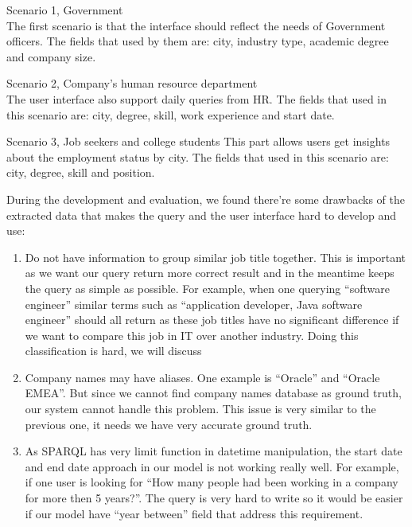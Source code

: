\begin{description}
	\item Scenario 1, Government \hfill \\
	The first scenario is that the interface should reflect the needs of Government officers. The fields that used by them are: city, industry type, academic degree and company size.
	\item Scenario 2, Company's human resource department \hfill \\
	The user interface also support daily queries from HR. The fields that used in this scenario are: city, degree, skill, work experience and start date.
	\item Scenario 3, Job seekers and college students
	This part allows users get insights about the employment status by city. The fields that used in this scenario are: city, degree, skill and position.
\end{description}

During the development and evaluation, we found there're some drawbacks of the extracted data that makes the query and the user interface hard to develop and use:
\begin{enumerate}
	\item Do not have information to group similar job title together. This is important as we want our query return more correct result and in the meantime keeps the query as simple as possible. For example, when one querying ``software engineer'' similar terms such as ``application developer, Java software engineer'' should all return as these job titles have no significant difference if we want to compare this job in IT over another industry. Doing this classification is hard, we will discuss 
	\item Company names may have aliases. One example is ``Oracle'' and ``Oracle EMEA''. But since we cannot find company names database as ground truth, our system cannot handle this problem. This issue is very similar to the previous one, it needs we have very accurate ground truth.
	\item As SPARQL has very limit function in datetime manipulation, the start date and end date approach in our model is not working really well. For example, if one user is looking for ``How many people had been working in a company for more then 5 years?''. The query is very hard to write so it would be easier if our model have ``year between'' field that address this requirement.
\end{enumerate}

